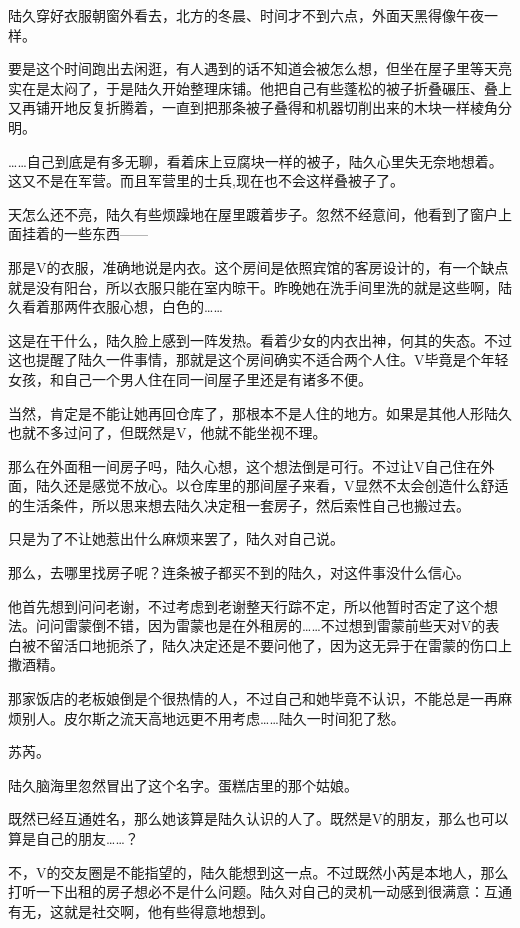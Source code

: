 陆久穿好衣服朝窗外看去，北方的冬晨、时间才不到六点，外面天黑得像午夜一样。

要是这个时间跑出去闲逛，有人遇到的话不知道会被怎么想，但坐在屋子里等天亮实在是太闷了，于是陆久开始整理床铺。他把自己有些蓬松的被子折叠碾压、叠上又再铺开地反复折腾着，一直到把那条被子叠得和机器切削出来的木块一样棱角分明。

……自己到底是有多无聊，看着床上豆腐块一样的被子，陆久心里失无奈地想着。这又不是在军营。而且军营里的士兵,现在也不会这样叠被子了。

天怎么还不亮，陆久有些烦躁地在屋里踱着步子。忽然不经意间，他看到了窗户上面挂着的一些东西——

那是V的衣服，准确地说是内衣。这个房间是依照宾馆的客房设计的，有一个缺点就是没有阳台，所以衣服只能在室内晾干。昨晚她在洗手间里洗的就是这些啊，陆久看着那两件衣服心想，白色的……

这是在干什么，陆久脸上感到一阵发热。看着少女的内衣出神，何其的失态。不过这也提醒了陆久一件事情，那就是这个房间确实不适合两个人住。V毕竟是个年轻女孩，和自己一个男人住在同一间屋子里还是有诸多不便。

当然，肯定是不能让她再回仓库了，那根本不是人住的地方。如果是其他人形陆久也就不多过问了，但既然是V，他就不能坐视不理。

那么在外面租一间房子吗，陆久心想，这个想法倒是可行。不过让V自己住在外面，陆久还是感觉不放心。以仓库里的那间屋子来看，V显然不太会创造什么舒适的生活条件，所以思来想去陆久决定租一套房子，然后索性自己也搬过去。

只是为了不让她惹出什么麻烦来罢了，陆久对自己说。

那么，去哪里找房子呢？连条被子都买不到的陆久，对这件事没什么信心。

他首先想到问问老谢，不过考虑到老谢整天行踪不定，所以他暂时否定了这个想法。问问雷蒙倒不错，因为雷蒙也是在外租房的……不过想到雷蒙前些天对V的表白被不留活口地扼杀了，陆久决定还是不要问他了，因为这无异于在雷蒙的伤口上撒酒精。

那家饭店的老板娘倒是个很热情的人，不过自己和她毕竟不认识，不能总是一再麻烦别人。皮尔斯之流天高地远更不用考虑……陆久一时间犯了愁。

苏芮。

陆久脑海里忽然冒出了这个名字。蛋糕店里的那个姑娘。

既然已经互通姓名，那么她该算是陆久认识的人了。既然是V的朋友，那么也可以算是自己的朋友……？

不，V的交友圈是不能指望的，陆久能想到这一点。不过既然小芮是本地人，那么打听一下出租的房子想必不是什么问题。陆久对自己的灵机一动感到很满意：互通有无，这就是社交啊，他有些得意地想到。

